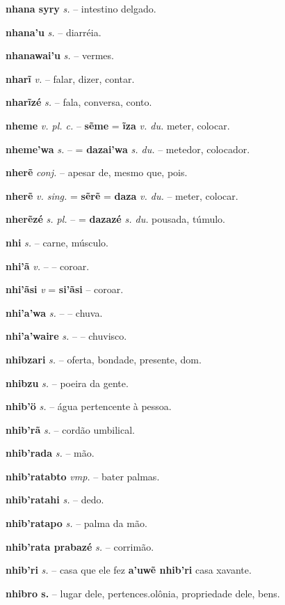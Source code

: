 \textbf{nhana syry} \textit{s.} -- intestino delgado.

\textbf{nhana'u} \textit{s.} -- diarréia.

\textbf{nhanawai'u} \textit{s.} -- vermes.

\textbf{nharĩ} \textit{v.} -- falar, dizer, contar.

\textbf{nharĩzé} \textit{s.} -- fala, conversa, conto.

\textbf{nheme} \textit{v. pl. c.} -- \textbf{sẽme} = \textbf{ĩza} \textit{v. du.} meter, colocar.

\textbf{nheme'wa} \textit{s.} -- = \textbf{dazai'wa} \textit{s. du.} -- metedor, colocador.

\textbf{nherẽ} \textit{conj.} -- apesar de, mesmo que, pois.

\textbf{nherẽ} \textit{v. sing.} = \textbf{sẽrẽ} = \textbf{daza} \textit{v. du.} -- meter, colocar.

\textbf{nherẽzé} \textit{s. pl.} -- = \textbf{dazazé} \textit{s. du.} pousada, túmulo.

\textbf{nhi} \textit{s.} -- carne, músculo.

\textbf{nhi'ã} \textit{v.} -- -- coroar.

\textbf{nhi'ãsi} \textit{v} = \textbf{si'ãsi} -- coroar.

\textbf{nhi'a'wa} \textit{s.} -- -- chuva.

\textbf{nhi'a'waire} \textit{s.} -- -- chuvisco.

\textbf{nhibzari} \textit{s.} -- oferta, bondade, presente, dom.

\textbf{nhibzu} \textit{s.} -- poeira da gente.

\textbf{nhib'ö} \textit{s.} -- água pertencente à pessoa.

\textbf{nhib'rã} \textit{s.} -- cordão umbilical.

\textbf{nhib'rada} \textit{s.} -- mão.

\textbf{nhib'ratabto} \textit{vmp.} -- bater palmas.

\textbf{nhib'ratahi} \textit{s.} -- dedo.

\textbf{nhib'ratapo} \textit{s.} -- palma da mão.

\textbf{nhib'rata prabazé} \textit{s.} -- corrimão.

\textbf{nhib'ri} \textit{s.} -- casa que ele fez  \textbf{a'uwẽ nhib'ri} casa xavante.

\textbf{nhibro s.} -- lugar dele, pertences.olônia, propriedade dele, bens.


